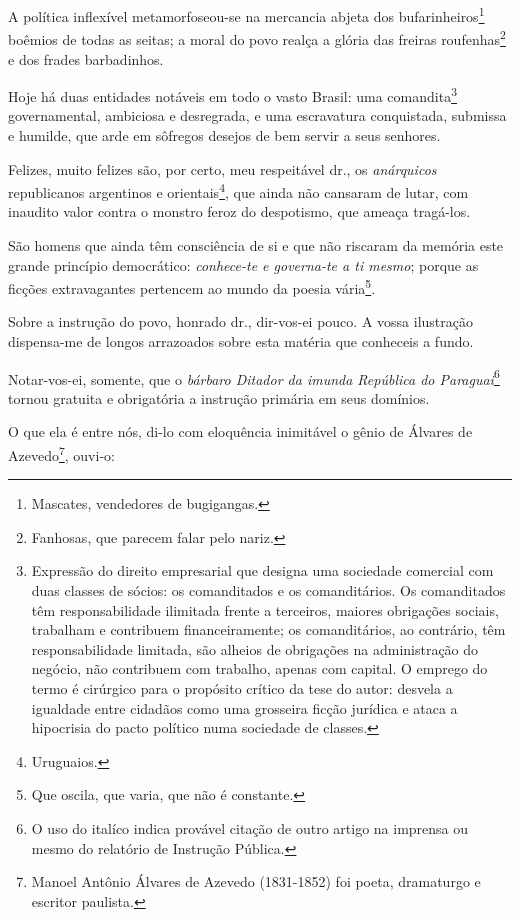 A política inflexível metamorfoseou-se na mercancia abjeta dos
bufarinheiros\footnote{Mascates, vendedores de bugigangas.} boêmios de
todas as seitas; a moral do povo realça a glória das freiras
roufenhas\footnote{Fanhosas, que parecem falar pelo nariz.} e dos
frades barbadinhos.

Hoje há duas entidades notáveis em todo o vasto Brasil: uma
comandita\footnote{Expressão do direito empresarial que designa uma
  sociedade comercial com duas classes de sócios: os comanditados e os
  comanditários. Os comanditados têm responsabilidade ilimitada frente a
  terceiros, maiores obrigações sociais, trabalham e contribuem
  financeiramente; os comanditários, ao contrário, têm responsabilidade
  limitada, são alheios de obrigações na administração do negócio, não
  contribuem com trabalho, apenas com capital. O emprego do termo é
  cirúrgico para o propósito crítico da tese do autor: desvela a
  igualdade entre cidadãos como uma grosseira ficção jurídica e ataca a
  hipocrisia do pacto político numa sociedade de classes.}
governamental, ambiciosa e desregrada, e uma escravatura conquistada,
submissa e humilde, que arde em sôfregos desejos de bem servir a seus
senhores.

Felizes, muito felizes são, por certo, meu respeitável dr., os
\emph{anárquicos} republicanos argentinos e orientais\footnote{
  Uruguaios.}, que ainda não cansaram de lutar, com inaudito valor
contra o monstro feroz do despotismo, que ameaça tragá-los.

São homens que ainda têm consciência de si e que não riscaram da memória
este grande princípio democrático: \emph{conhece-te e governa-te a ti
mesmo}; porque as ficções extravagantes pertencem ao mundo da poesia
vária\footnote{Que oscila, que varia, que não é constante.}.

Sobre a instrução do povo, honrado dr., dir-vos-ei pouco. A vossa
ilustração dispensa-me de longos arrazoados sobre esta matéria que
conheceis a fundo.

Notar-vos-ei, somente, que o \emph{bárbaro Ditador da imunda República
do Paraguai}\footnote{O uso do italíco indica provável citação de
  outro artigo na imprensa ou mesmo do relatório de Instrução Pública.}
tornou gratuita e obrigatória a instrução primária em seus domínios.

O que ela é entre nós, di-lo com eloquência inimitável o gênio de
Álvares de Azevedo\footnote{Manoel Antônio Álvares de Azevedo
  (1831-1852) foi poeta, dramaturgo e escritor paulista.}, ouvi-o:

